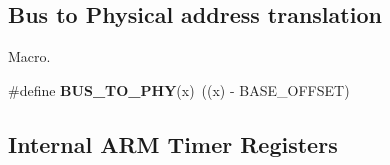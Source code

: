 \subsection*{Bus to Physical address translation}
\label{_amgrpb814d5eb5351d5779b44317b6dc3ad3e}%
 Macro. \begin{DoxyCompactItemize}
\item 
\mbox{\label{group__raspberrypi__reg_gad86ca2b0b62696ab33479241c38e238a}} 
\#define {\bfseries B\+U\+S\+\_\+\+T\+O\+\_\+\+P\+HY}(x)~((x) -\/ B\+A\+S\+E\+\_\+\+O\+F\+F\+S\+ET)
\end{DoxyCompactItemize}
\subsection*{Internal A\+RM Timer Registers}
